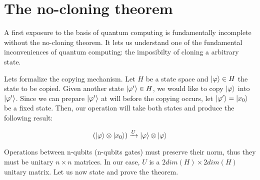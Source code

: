 \section{The no-cloning theorem}


A first exposure to the basis of quantum computing is fundamentally incomplete without the no-cloning theorem. It lets us understand one of the fundamental inconveniences of quantum computing: the imposibilty of cloning a arbitrary state.

Lets formalize the copying mechanism. Let $H$ be a state space and $|\varphi\rangle \in H$ the state to be copied. Given another state $|\varphi'\rangle \in H$, we would like to copy $|\varphi\rangle$ into $|\varphi'\rangle$. Since we can prepare $|\varphi'\rangle$ at will before the copying occurs, let  $|\varphi'\rangle = |x_0\rangle$ be a fixed state. Then, our operation will take both states and produce the following result:

$$ (|\varphi\rangle \otimes |x_0\rangle) \xrightarrow{U} |\varphi\rangle \otimes |\varphi\rangle $$

Operations between n-qubits (n-qubits gates) must preserve their norm, thus they must be unitary $n \times n$ matrices. In our case, $U$ is a $2 dim(H) \times 2 dim(H)$ unitary matrix. Let us now state and prove the theorem.

